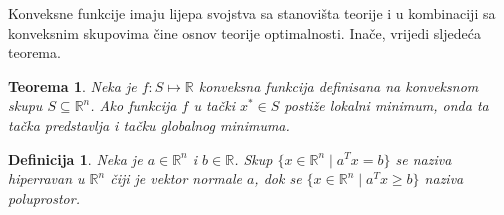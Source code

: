 \documentclass[b5paper, utf8, 11pt, colorlinks]{book}
\newtheorem{definition}{Definicija}[chapter]
\newtheorem{thm}{Teorema}[chapter]
\theoremstyle{definition}
\begin{document}
Konveksne funkcije imaju lijepa svojstva sa stanovišta teorije i u kombinaciji sa konveksnim skupovima čine osnov  teorije optimalnosti. Inače, vrijedi sljedeća teorema.
\begin{thm}\label{thm:globalopt}
  Neka je $f : S \mapsto \mathbb{R}$ konveksna funkcija definisana na konveksnom skupu $S \subseteq \mathbb{R}^n$. Ako funkcija $f$ u tački $x^* \in S$
 postiže lokalni minimum, onda ta tačka predstavlja i tačku globalnog minimuma.
\end{thm}

 \begin{definition}
   Neka je $a\in \mathbb{R}^n $ i $b \in \mathbb{R}$. Skup $\{ x \in \mathbb{R}^n \mid a^T x = b \}$ se naziva hiperravan u $\mathbb{R}^n$ čiji je vektor normale $a$, dok se $\{ x \in \mathbb{R}^n \mid a^T x \geq b \}$ naziva poluprostor.  
\end{definition}
\end{document}

